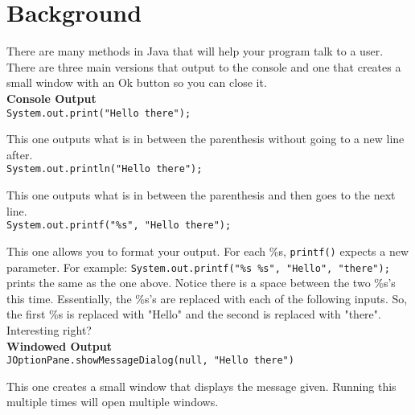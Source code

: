 \documentclass{report}
\begin{document}
\section{Background}
\hspace{2em}\large{There are many methods in Java that will help your program talk to a user. There are three main versions that output to the console and one that creates a small window with an Ok button so you can close it.\\

\textbf{Console Output}\hrulefill\\

\texttt{System.out.print("Hello there");}

\hspace{2em}This one outputs what is in between the parenthesis without going to a new line after.\\

\texttt{System.out.println("Hello there");}

\hspace{2em}This one outputs what is in between the parenthesis and then goes to the next line.\\

\texttt{System.out.printf("\%s", "Hello there");}

\hspace{2em}This one allows you to format your output. For each \%s, \texttt{printf()} expects a new parameter. For example:
\texttt{System.out.printf("\%s \%s", "Hello", "there");}\\
prints the same as the one above. Notice there is a space between the two \%s's this time. Essentially, the \%s's are replaced with each of the following inputs. So, the first \%s is replaced with "Hello" and the second is replaced with "there". Interesting right?\\

\textbf{Windowed Output}\hrulefill\\

\texttt{JOptionPane.showMessageDialog(null, "Hello there")}
 
\hspace{2em}This one creates a small window that displays the message given. Running this multiple times will open multiple windows.\\
}

\normalsize{}

\end{document}
